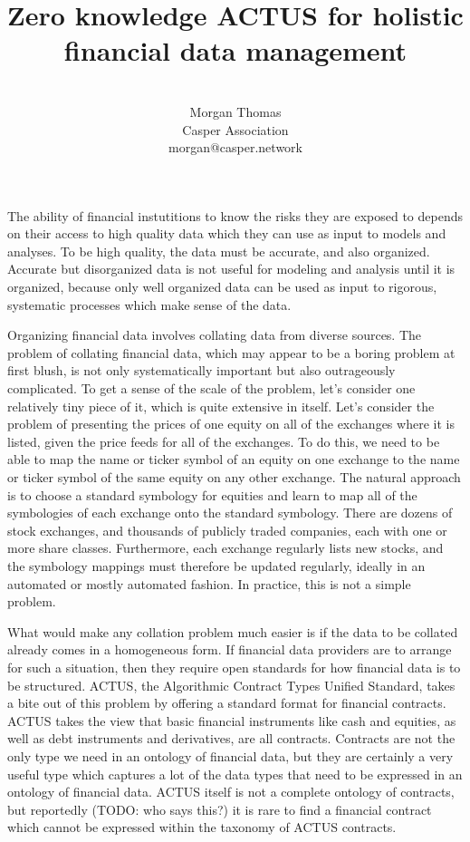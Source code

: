 \documentclass[11pt]{article}
\title{Zero knowledge ACTUS for holistic financial data management}
\author{ \\ Morgan Thomas \\ Casper Association \\ morgan@casper.network }
\begin{document}
\maketitle

The ability of financial instutitions to know the risks they are exposed to
depends on their access to high quality data which they can use as input to
models and analyses. To be high quality, the data must be accurate, and also
organized. Accurate but disorganized data is not useful for modeling and analysis
until it is organized, because only well organized data can be used as input to
rigorous, systematic processes which make sense of the data.

Organizing financial data involves collating data from diverse sources.
The problem of collating financial data, which may appear to be a boring problem
at first blush, is not only systematically important but also outrageously
complicated. To get a sense of the scale of the problem, let's consider one
relatively tiny piece of it, which is quite extensive in itself. Let's consider
the problem of presenting the prices of one equity on all of the exchanges
where it is listed, given the price feeds for all of the exchanges. To do this,
we need to be able to map the name or ticker symbol of an equity on one exchange
to the name or ticker symbol of the same equity on any other exchange. The natural
approach is to choose a standard symbology for equities and learn to map all of
the symbologies of each exchange onto the standard symbology. There are dozens
of stock exchanges, and thousands of publicly traded companies, each with one
or more share classes. Furthermore, each exchange regularly lists new stocks, and
the symbology mappings must therefore be updated regularly, ideally in an automated
or mostly automated fashion. In practice, this is not a simple problem.

What would make any collation problem much easier is if the data to be collated
already comes in a homogeneous form. If financial data providers are to arrange
for such a situation, then they require open standards for how financial data is to
be structured.
ACTUS, the Algorithmic Contract Types Unified Standard, takes a bite out of this
problem by offering a standard format for financial contracts. ACTUS takes the
view that basic financial instruments like cash and equities, as well as
debt instruments and derivatives, are all contracts. Contracts are not the only
type we need in an ontology of financial data, but they are certainly a very
useful type which captures a lot of the data types that need to be expressed
in an ontology of financial data. ACTUS itself is not a complete ontology of
contracts, but reportedly (TODO: who says this?) it is rare to find a financial
contract which cannot be expressed within the taxonomy of ACTUS contracts.
\end{document}
